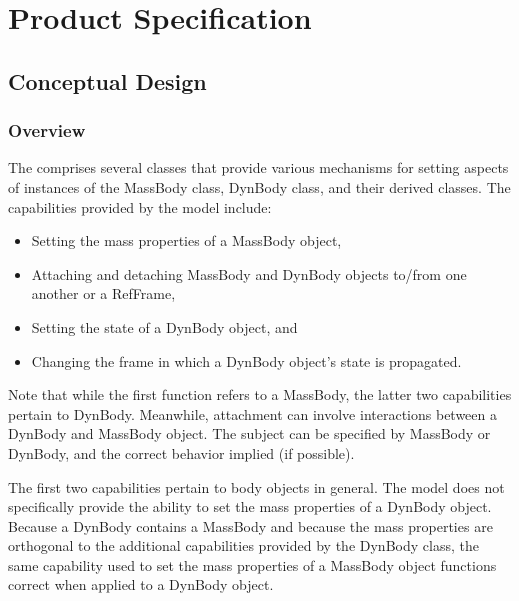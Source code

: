 %

\chapter{Product Specification}
\label{ch:overview:spec}

\section{Conceptual Design}
\subsection{Overview}
The \ModelDesc comprises several classes that provide various mechanisms
for setting aspects of instances of the MassBody class, DynBody class, and
their derived classes. The capabilities provided by the model include:
\begin{itemize}
\item Setting the mass properties of a MassBody object,
\item Attaching and detaching MassBody and DynBody objects to/from one another or a RefFrame,
\item Setting the state of a DynBody object, and
\item Changing the frame in which a DynBody object's state is propagated.
\end{itemize}

Note that while the first function refers to a MassBody, the latter two
capabilities pertain to DynBody. Meanwhile, attachment can involve
interactions between a DynBody and MassBody object.
The subject can be specified by MassBody or DynBody, and the correct behavior
implied (if possible).

The first two capabilities pertain to body objects in general.
The model does not specifically provide the ability to set the mass properties of a DynBody object.
Because a DynBody contains a MassBody and because the mass properties are orthogonal
to the additional capabilities provided by the DynBody class,
the same capability used to set the mass properties
of a MassBody object functions correct when applied to a DynBody object.

